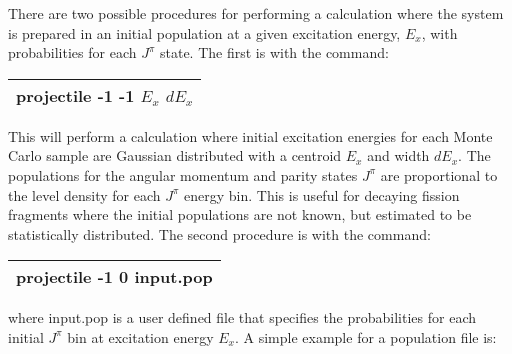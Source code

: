 \documentclass[
10pt,
showpacs,preprintnumbers,nofootinbib,
amsmath,amssymb,
aps,prc,groupedaddress,superscriptaddress,
notitlepage,showkeys
]{revtex4-1}
\begin{document}
There are two possible procedures for performing a calculation where the system is prepared in an initial population at a given excitation energy, $E_x$, with probabilities for each $J^\pi$ state. The first is with the command:
\begin{center}
\begin{tabular}{| p{10 cm}|}
\hline
projectile -1 -1 $E_x$ $dE_x$\\
\hline
\end{tabular}
\end{center}
This will perform a calculation where initial excitation energies for each Monte Carlo sample are Gaussian distributed with a centroid $E_x$ and width $dE_x$. The populations for the angular momentum and parity states $J^\pi$ are proportional to the level density for each $J^\pi$ energy bin. This is useful for decaying fission fragments where the initial populations are not known, but estimated to be statistically distributed.
The second procedure is with the command:\\
\begin{center}
\begin{tabular}{| p{10 cm}|}
\hline
projectile -1 0 input.pop\\
\hline
\end{tabular}
\end{center}
where input.pop is a user defined file that specifies the probabilities for each initial $J^\pi$ bin at excitation energy $E_x$. A simple example for a population file is:
\end{document}
